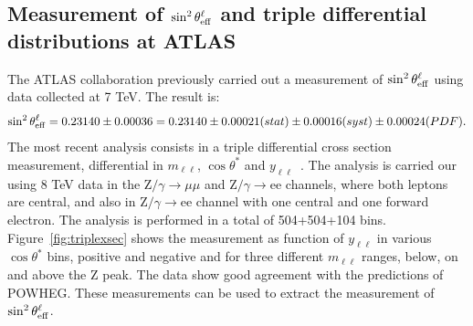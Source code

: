 \documentclass{moriond}
\def\stl{\sin^2\theta^\ell_{\rm eff}}
\begin{document}
\subsection{Measurement of $\stl$ and triple differential distributions at ATLAS}
The ATLAS collaboration previously carried out a measurement of $\stl$
using data collected at 7 TeV. The result is:
\begin{equation*}
\stl = 0.23140 \pm 0.00036 = 0.23140 \pm 0.00021(stat) \pm 0.00016(syst) \pm 0.00024(PDF).
\end{equation*}
The most recent analysis consists in a triple differential cross
section measurement, differential in $m_{\ell\ell}$, $\cos\theta^*$
and $y_{\ell\ell}$~\cite{Aaboud:2017ffb}. The analysis is carried our
using 8 TeV data in the Z$/\gamma\to\mu\mu$ and Z$/\gamma \to$ee
channels, where both leptons are central, and also in Z$/\gamma \to$ee
channel with one central and one forward electron. The analysis is
performed in a total of 504+504+104 bins. Figure~\ref{fig:triplexsec}
shows the measurement as function of $y_{\ell\ell}$ in various
$\cos\theta^*$ bins, positive and negative and for three different
$m_{\ell\ell}$ ranges, below, on and above the Z peak. The data show
good agreement with the predictions of POWHEG. These measurements can
be used to extract the measurement of $\stl$.
\end{document}
